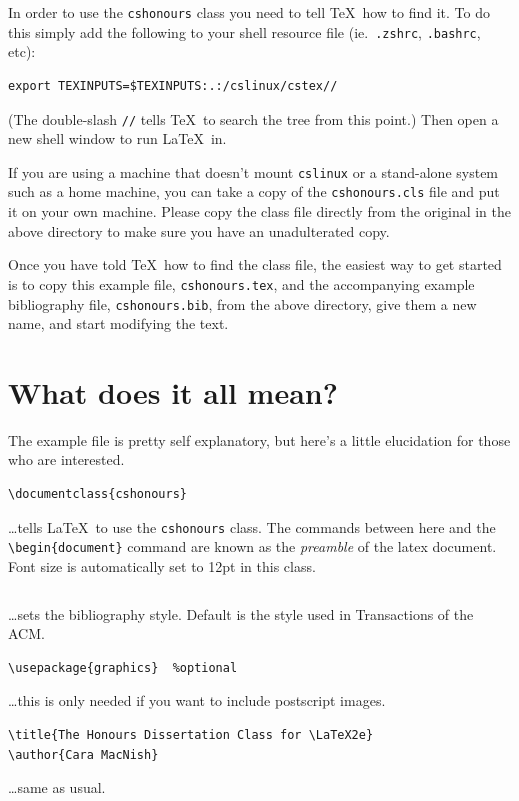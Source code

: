 \documentclass{cshonours}
\begin{document}
In order to use the {\tt cshonours} class you need to tell \TeX\ how
to find it. To do this simply add the following to your shell resource
file (ie.\ {\tt .zshrc}, {\tt .bashrc}, etc):
\begin{verbatim}
export TEXINPUTS=$TEXINPUTS:.:/cslinux/cstex//
\end{verbatim}
(The double-slash \verb!//! tells \TeX\ to search the tree from this
point.) Then open a new shell window to run \LaTeX\ in.

If you are using a machine that doesn't mount {\tt cslinux} or a
stand-alone system such as a home machine, you can take a copy of the
{\tt cshonours.cls} file and put it on your own machine. Please copy
the class file directly from the original in the above directory to
make sure you have an unadulterated copy.

Once you have told \TeX\ how to find the class file, the easiest way
to get started is to copy this example file, {\tt cshonours.tex}, and
the accompanying example bibliography file, {\tt cshonours.bib}, from
the above directory, give them a new name, and start modifying the text.

\section{What does it all mean?}
\label{code}

The example file is pretty self explanatory, but here's a little
elucidation for those who are interested.

\begin{verbatim}
\documentclass{cshonours}
\end{verbatim}
\ldots tells \LaTeX\ to use the {\tt cshonours} class. The commands
between here and the \verb!\begin{document}! command are known as the
{\em preamble\/} of the latex document. Font size is automatically set
to 12pt in this class.

\begin{verbatim}

\end{verbatim}
\ldots sets the bibliography style. Default is the style used in
Transactions of the ACM.

\begin{verbatim}
\usepackage{graphics}  %optional
\end{verbatim}
\ldots this is only needed if you want to include postscript images.

\begin{verbatim}
\title{The Honours Dissertation Class for \LaTeX2e}
\author{Cara MacNish}
\end{verbatim}
\ldots same as usual.
\end{document}
